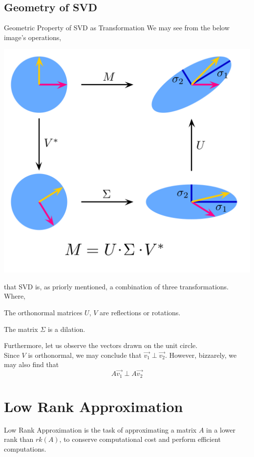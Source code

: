 \subsection{Geometry of SVD}
\begin{ln-fig}{Geometric Property of SVD as Transformation}{}
    We may see from the below image's operations,
    \begin{center}
        \includegraphics[scale=0.14]{figs/ln05/svd_geometry.png}
    \end{center}
    that SVD is, as priorly mentioned, a combination of three transformations. Where,
    \begin{bindenum}
        \item The orthonormal matrices $U$, $V$ are reflections or rotations.
        \item The matrix $\Sigma$ is a dilation.
    \end{bindenum}
    Furthermore, let us observe the vectors drawn on the unit circle. \\
    Since $V$ is orthonormal, we may conclude that $\vec{v_1} \perp \vec{v_2}$. However, bizzarely, we may also find that
    \[A \vec{v_1} \perp A \vec{v_2}\]
\end{ln-fig}

\section{Low Rank Approximation}
Low Rank Approximation is the task of approximating a matrix $A$ in a lower rank than $rk(A)$, to conserve computational cost and perform efficient computations.

